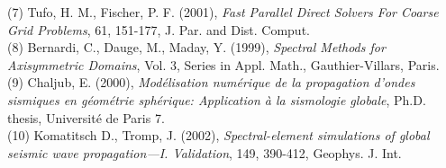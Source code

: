 \documentclass[11pt,letter,fleqn,english,notitlepage]{article}
\begin{document}
(7) Tufo, H. M., Fischer, P. F. (2001), \textit{Fast Parallel Direct Solvers For Coarse Grid Problems}, 
61, 151-177, J. Par. and Dist. Comput.\\

(8) Bernardi, C., Dauge, M., Maday, Y. (1999), \textit{Spectral Methods for Axisymmetric Domains}, 
Vol. 3, Series in Appl. Math., Gauthier-Villars, Paris.\\

(9) Chaljub, E. (2000), \textit{Mod{\'{e}}lisation num{\'{e}}rique de la 
propagation d'ondes sismiques en g{\'{e}}om{\'{e}}trie sph{\'{e}}rique:
Application {\`{a}} la sismologie globale}, 
Ph.D. thesis, Universit{\'{e}} de Paris 7.\\

(10) Komatitsch D., Tromp, J. (2002), \textit{Spectral-element simulations of
global seismic wave propagation---I. Validation},
149, 390-412, Geophys. J. Int.
\end{document}
